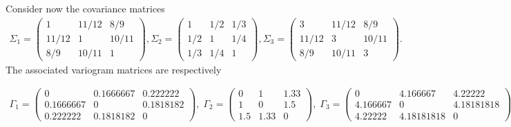 \documentclass[
]{article}
\begin{document}
Consider now the covariance matrices \[
\begin{aligned}
\Sigma_1=
\begin{pmatrix}
1 & 11/12 & 8/9\\
11/12 & 1 & 10/11 \\
8/9 & 10/11 & 1
\end{pmatrix}, 
\Sigma_2=
\begin{pmatrix}
1 & 1/2 & 1/3\\
1/2 & 1 & 1/4 \\
1/3 & 1/4 & 1
\end{pmatrix},
\Sigma_3=
\begin{pmatrix}
3 & 11/12 & 8/9\\
11/12 & 3 & 10/11 \\
8/9 & 10/11 & 3
\end{pmatrix}.
\end{aligned}
\] The associated variogram matrices are respectively

\[
\begin{aligned}
\Gamma_1=
\begin{pmatrix}
0 & 0.1666667 & 0.222222\\
0.1666667 & 0 & 0.1818182 \\
0.222222 & 0.1818182 & 0
\end{pmatrix},
 \;\Gamma_2=
\begin{pmatrix}
0 & 1 & 1.33\\
1 & 0 & 1.5 \\
1.5 & 1.33 & 0
\end{pmatrix},
 \;\Gamma_3=
\begin{pmatrix}
0 & 4.166667 & 4.22222\\
4.166667 & 0 & 4.18181818\\
4.22222 &  4.18181818& 0
\end{pmatrix}.
\end{aligned}
\]
\end{document}
